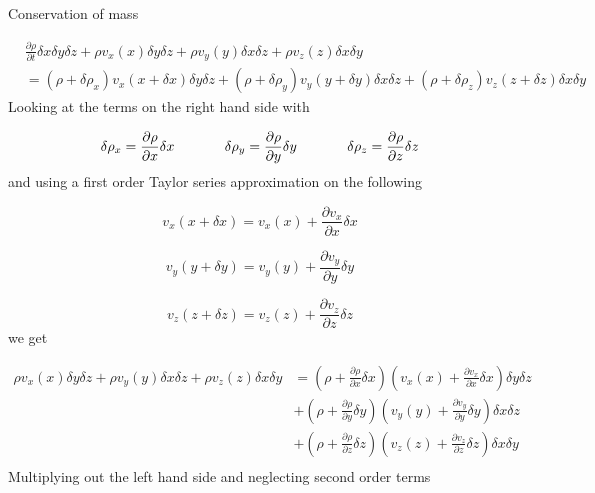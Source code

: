 Conservation of mass

\begin{equation*}
  \begin{split}
    &\frac{\partial\rho}{\partial{}t}\delta x\delta y\delta z+\rho{}v_{x}(x)\delta y\delta z+\rho{}v_{y}(y)\delta x\delta z+\rho{}v_{z}(z)\delta x\delta y \\
    &=(\rho+\delta\rho_{x})v_{x}(x+\delta x)\delta y\delta z+(\rho+\delta\rho_{y})v_{y}(y+\delta y)\delta x\delta z+(\rho+\delta\rho_{z})v_{z}(z+\delta z)\delta x\delta y
  \end{split}
\end{equation*}
Looking at the terms on the right hand side with

\begin{equation*}
  \delta\rho_{x}=\frac{\partial\rho}{\partial{}x}\delta x
  \hspace{0.5in}
  \delta\rho_{y}=\frac{\partial\rho}{\partial{}y}\delta y
  \hspace{0.5in}
  \delta\rho_{z}=\frac{\partial\rho}{\partial{}z}\delta z
\end{equation*}
and using a first order Taylor series approximation on the following

\begin{equation*}
  v_{x}(x+\delta x)=v_{x}(x)+\frac{\partial{}v_{x}}{\partial{}x}\delta x
\end{equation*}

\begin{equation*}
  v_{y}(y+\delta y)=v_{y}(y)+\frac{\partial{}v_{y}}{\partial{}y}\delta y
\end{equation*}

\begin{equation*}
  v_{z}(z+\delta z)=v_{z}(z)+\frac{\partial{}v_{z}}{\partial{}z}\delta z
\end{equation*}
we get

\begin{equation*}
  \begin{split}
  \rho{}v_{x}(x)\delta y\delta z+\rho{}v_{y}(y)\delta x\delta z+\rho{}v_{z}(z)\delta x\delta y
  &=\left(\rho+\frac{\partial\rho}{\partial{}x}\delta x\right)\left(v_{x}(x)+\frac{\partial{}v_{x}}{\partial{}x}\delta x\right)\delta y\delta z \\
  &+\left(\rho+\frac{\partial\rho}{\partial{}y}\delta y\right)\left(v_{y}(y)+\frac{\partial{}v_{y}}{\partial{}y}\delta y\right)\delta x\delta z \\
  &+\left(\rho+\frac{\partial\rho}{\partial{}z}\delta z\right)\left(v_{z}(z)+\frac{\partial{}v_{z}}{\partial{}z}\delta z\right)\delta x\delta y \\
  \end{split}
\end{equation*}
Multiplying out the left hand side and neglecting second order terms


